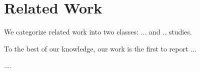 
\section{Related Work} \label{Sec:relatedWorkSection}

We categorize related work into two classes: ... and .. studies.


To the best of our knowledge, our work is the first to report ... 


....
